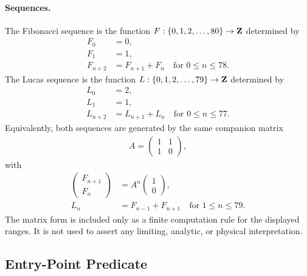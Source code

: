\paragraph{Sequences.}
The Fibonacci sequence is the function $F:\{0,1,2,\ldots,80\}\to {\bf Z}$ determined by
$$
\begin{aligned}
F_0 &= 0,\\
F_1 &= 1,\\
F_{n+2} &= F_{n+1}+F_n \quad \text{for } 0\leq n\leq 78.
\end{aligned}
$$
The Lucas sequence is the function $L:\{0,1,2,\ldots,79\}\to {\bf Z}$ determined by
$$
\begin{aligned}
L_0 &= 2,\\
L_1 &= 1,\\
L_{n+2} &= L_{n+1}+L_n \quad \text{for } 0\leq n\leq 77.
\end{aligned}
$$
Equivalently, both sequences are generated by the same companion matrix
$$
\begin{aligned}
A=\begin{pmatrix}1&1\\1&0\end{pmatrix},
\end{aligned}
$$
with
$$
\begin{aligned}
\begin{pmatrix}F_{n+1}\\F_n\end{pmatrix} &= A^n\begin{pmatrix}1\\0\end{pmatrix},\\
L_n &= F_{n-1}+F_{n+1} \quad \text{for } 1\leq n\leq 79.
\end{aligned}
$$
The matrix form is included only as a finite computation rule for the displayed ranges. It is not used to assert any limiting, analytic, or physical interpretation.

\subsection{Entry-Point Predicate}
\label{sec:window6-fib-entry-point-predicate}

